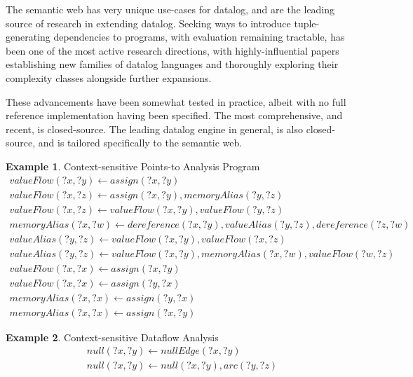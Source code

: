 \documentclass[manuscript,screen,review]{acmart}
\theoremstyle{definition}
\newtheorem{exmp}{Example}[section]
\begin{document}
The semantic web has very unique use-cases for datalog, and are the leading source of research in extending datalog. Seeking ways to introduce tuple-generating dependencies to
programs, with evaluation remaining tractable, has been one of the most active research directions, with highly-influential papers establishing new families of datalog
languages\cite{datalog_plus_minus} and thoroughly exploring their complexity classes alongside further expansions\cite{sticky,warded,monadic}.

These advancements have been somewhat tested in practice, albeit with no full reference implementation having been specified. The most comprehensive, and recent, is closed-source\cite{vadalog}.
The leading datalog engine in general, is also closed-source\cite{rdfox}, and is tailored specifically to the semantic web.

\begin{exmp}{Context-sensitive Points-to Analysis Program}
	\begin{align}
		valueFlow(?x, ?y) \leftarrow assign(?x, ?y)                                                 \\
		valueFlow(?x, ?z) \leftarrow assign(?x, ?y), memoryAlias(?y, ?z)                            \\
		valueFlow(?x, ?z) \leftarrow valueFlow(?x, ?y), valueFlow(?y, ?z)                           \\
		memoryAlias(?x, ?w) \leftarrow dereference(?x, ?y), valueAlias(?y, ?z), dereference(?z, ?w) \\
		valueAlias(?y, ?z) \leftarrow valueFlow(?x, ?y), valueFlow(?x, ?z)                          \\
		valueAlias(?y, ?z) \leftarrow valueFlow(?x, ?y), memoryAlias(?x, ?w), valueFlow(?w, ?z)     \\
		valueFlow(?x, ?x) \leftarrow assign(?x, ?y)                                                 \\
		valueFlow(?x, ?x) \leftarrow assign(?y, ?x)                                                 \\
		memoryAlias(?x, ?x) \leftarrow assign(?y, ?x)                                               \\
		memoryAlias(?x, ?x) \leftarrow assign(?x, ?y)
	\end{align}
	\label{program:cspa}
\end{exmp}

\begin{exmp}{Context-sensitive Dataflow Analysis}
	\begin{align}
		null(?x, ?y) \leftarrow nullEdge(?x, ?y) \\
		null(?x, ?y) \leftarrow null(?x, ?y), arc(?y, ?z)
	\end{align}
	\label{program:csda}
\end{exmp}
\end{document}
